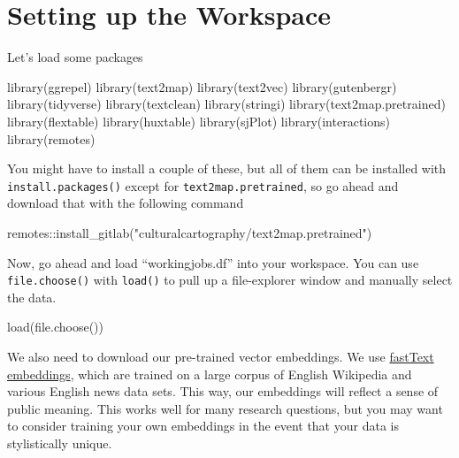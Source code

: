 \documentclass[
  letterpaper,
  DIV=11,
  numbers=noendperiod]{scrreprt}
\newenvironment{Shaded}{\begin{snugshade}}{\end{snugshade}}
\newcommand{\FunctionTok}[1]{\textcolor[rgb]{0.28,0.35,0.67}{#1}}
\newcommand{\NormalTok}[1]{\textcolor[rgb]{0.00,0.23,0.31}{#1}}
\newcommand{\SpecialCharTok}[1]{\textcolor[rgb]{0.37,0.37,0.37}{#1}}
\newcommand{\StringTok}[1]{\textcolor[rgb]{0.13,0.47,0.30}{#1}}
\begin{document}
\section{Setting up the Workspace}\label{setting-up-the-workspace}

Let's load some packages

\begin{Shaded}
\begin{Highlighting}[]
\FunctionTok{library}\NormalTok{(ggrepel)}
\FunctionTok{library}\NormalTok{(text2map)}
\FunctionTok{library}\NormalTok{(text2vec)}
\FunctionTok{library}\NormalTok{(gutenbergr)}
\FunctionTok{library}\NormalTok{(tidyverse)}
\FunctionTok{library}\NormalTok{(textclean)}
\FunctionTok{library}\NormalTok{(stringi)}
\FunctionTok{library}\NormalTok{(text2map.pretrained)}
\FunctionTok{library}\NormalTok{(flextable)}
\FunctionTok{library}\NormalTok{(huxtable)}
\FunctionTok{library}\NormalTok{(sjPlot)}
\FunctionTok{library}\NormalTok{(interactions)}
\FunctionTok{library}\NormalTok{(remotes)}
\end{Highlighting}
\end{Shaded}

You might have to install a couple of these, but all of them can be
installed with \texttt{install.packages()} except for
\texttt{text2map.pretrained}, so go ahead and download that with the
following command

\begin{Shaded}
\begin{Highlighting}[]
\NormalTok{remotes}\SpecialCharTok{::}\FunctionTok{install\_gitlab}\NormalTok{(}\StringTok{"culturalcartography/text2map.pretrained"}\NormalTok{)}
\end{Highlighting}
\end{Shaded}

Now, go ahead and load ``workingjobs.df'' into your workspace. You can
use \texttt{file.choose()} with \texttt{load()} to pull up a
file-explorer window and manually select the data.

\begin{Shaded}
\begin{Highlighting}[]
\FunctionTok{load}\NormalTok{(}\FunctionTok{file.choose}\NormalTok{())}
\end{Highlighting}
\end{Shaded}

We also need to download our pre-trained vector embeddings. We use
\href{https://fasttext.cc/docs/en/english-vectors.html}{fastText
embeddings}, which are trained on a large corpus of English Wikipedia
and various English news data sets. This way, our embeddings will
reflect a sense of public meaning. This works well for many research
questions, but you may want to consider training your own embeddings in
the event that your data is stylistically unique.
\end{document}

